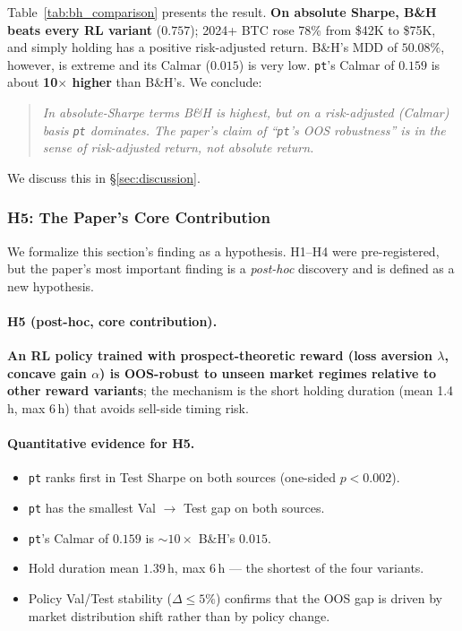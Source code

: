 \documentclass[11pt, a4paper]{article}
\begin{document}
Table~\ref{tab:bh_comparison} presents the result. \textbf{On absolute
Sharpe, B\&H beats every RL variant} ($0.757$); 2024+ BTC rose 78\% from
\$42K to \$75K, and simply holding has a positive risk-adjusted return. B\&H's
MDD of $50.08\%$, however, is extreme and its Calmar ($0.015$) is very low.
\texttt{pt}'s Calmar of $0.159$ is about \textbf{10$\times$ higher} than
B\&H's. We conclude:

\begin{quote}
\emph{In absolute-Sharpe terms B\&H is highest, but on a risk-adjusted
(Calmar) basis \texttt{pt} dominates. The paper's claim of ``\texttt{pt}'s
OOS robustness'' is in the sense of risk-adjusted return, not absolute
return.}
\end{quote}

We discuss this in \S\ref{sec:discussion}.

\subsubsection{H5: The Paper's Core Contribution}
\label{sec:oos_h5}

We formalize this section's finding as a hypothesis. H1--H4 were pre-registered,
but the paper's most important finding is a \emph{post-hoc} discovery and is
defined as a new hypothesis.

\paragraph{H5 (post-hoc, core contribution).}
\textbf{An RL policy trained with prospect-theoretic reward (loss aversion
$\lambda$, concave gain $\alpha$) is OOS-robust to unseen market regimes
relative to other reward variants}; the mechanism is the short holding
duration (mean 1.4\,h, max 6\,h) that avoids sell-side timing risk.

\paragraph{Quantitative evidence for H5.}
\begin{itemize}[leftmargin=*]
\item \texttt{pt} ranks first in Test Sharpe on both sources (one-sided
$p < 0.002$).
\item \texttt{pt} has the smallest Val $\to$ Test gap on both sources.
\item \texttt{pt}'s Calmar of $0.159$ is $\sim 10\times$ B\&H's $0.015$.
\item Hold duration mean $1.39$\,h, max $6$\,h --- the shortest of the four
variants.
\item Policy Val/Test stability ($\Delta \leq 5\%$) confirms that the OOS
gap is driven by market distribution shift rather than by policy change.
\end{itemize}
\end{document}
